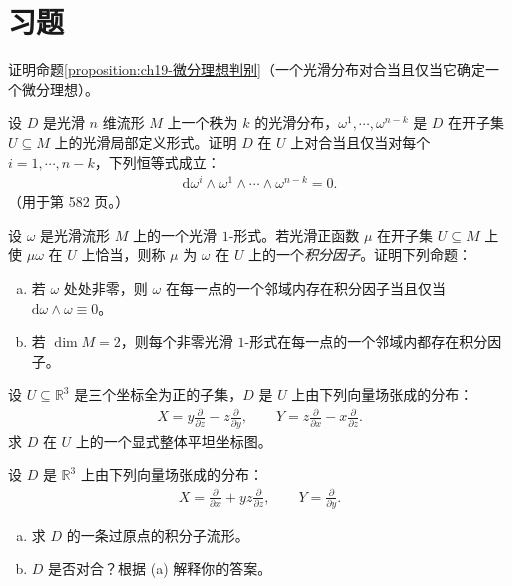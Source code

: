 \documentclass[../../main.tex]{subfiles}
\begin{document}
\section{习题}\label{section:ch19-problems}

\begin{exercise}\label{exercise:ch19-01}
证明命题\cref{proposition:ch19-微分理想判别}（一个光滑分布对合当且仅当它确定一个微分理想）。
\end{exercise}

\begin{exercise}\label{exercise:ch19-02}
设 $D$ 是光滑 $n$ 维流形 $M$ 上一个秩为 $k$ 的光滑分布，$\omega^1,\cdots ,\omega^{n-k}$ 是 $D$ 在开子集 $U\subseteq M$ 上的光滑局部定义形式。证明 $D$ 在 $U$ 上对合当且仅当对每个 $i=1,\cdots ,n-k$，下列恒等式成立：
\begin{align*}
\mathrm{d}\omega^i\wedge\omega^1\wedge\cdots\wedge\omega^{n-k}=0.
\end{align*}
（用于第 582 页。）
\end{exercise}

\begin{exercise}\label{exercise:ch19-03}
设 $\omega$ 是光滑流形 $M$ 上的一个光滑 $1$-形式。若光滑正函数 $\mu$ 在开子集 $U\subseteq M$ 上使 $\mu\omega$ 在 $U$ 上恰当，则称 $\mu$ 为 $\omega$ 在 $U$ 上的一个\emph{积分因子}。证明下列命题：
\begin{enumerate}[(a)]
\item 若 $\omega$ 处处非零，则 $\omega$ 在每一点的一个邻域内存在积分因子当且仅当 $\mathrm{d}\omega\wedge\omega\equiv 0$。
\item 若 $\dim M=2$，则每个非零光滑 $1$-形式在每一点的一个邻域内都存在积分因子。
\end{enumerate}
\end{exercise}

\begin{exercise}\label{exercise:ch19-04}
设 $U\subseteq\mathbb{R}^3$ 是三个坐标全为正的子集，$D$ 是 $U$ 上由下列向量场张成的分布：
\begin{align*}
X=y\frac{\partial}{\partial z}-z\frac{\partial}{\partial y},\qquad
Y=z\frac{\partial}{\partial x}-x\frac{\partial}{\partial z}.
\end{align*}
求 $D$ 在 $U$ 上的一个显式整体平坦坐标图。
\end{exercise}

\begin{exercise}\label{exercise:ch19-05}
设 $D$ 是 $\mathbb{R}^3$ 上由下列向量场张成的分布：
\begin{align*}
X=\frac{\partial}{\partial x}+yz\frac{\partial}{\partial z},\qquad Y=\frac{\partial}{\partial y}.
\end{align*}
\begin{enumerate}[(a)]
\item 求 $D$ 的一条过原点的积分子流形。
\item $D$ 是否对合？根据 (a) 解释你的答案。
\end{enumerate}
\end{exercise}
\end{document}

